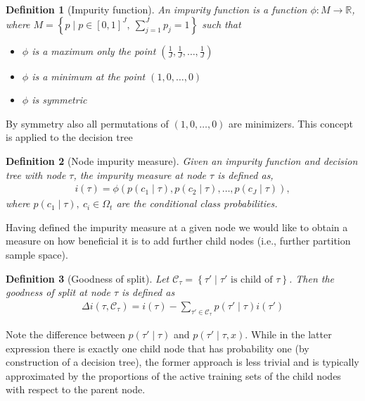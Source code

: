 \documentclass[12pt,a4paper]{article}
\newtheorem{definition}{Definition}
\begin{document}
\begin{definition}[Impurity function] \label{def:impurity_function}An impurity function is a function $\phi: M \rightarrow \mathbb R$, where $M=\left\{p \mid p\in [0,1]^J, ~ \sum_{j=1}^J p_j=1\right\}$ such that
	\begin{itemize}\itemsep0em 
		\item $\phi$ is a maximum only the point $\left(\frac{1}{J}, \frac{1}{J}, \dots, \frac{1}{J}\right)$
		\item $\phi$ is a minimum at the point  $\left(1, 0, \dots, 0\right)$
		\item $\phi$ is symmetric
	\end{itemize}
\end{definition}
By symmetry also all permutations of $\left(1, 0, \dots, 0\right)$ are minimizers. This concept is applied to the decision tree
\begin{definition}[Node impurity measure] Given an impurity function and decision tree with node $\tau$, the impurity measure at node $\tau$ is defined as,
\begin{align*}
	i(\tau) = \phi(p(c_1\mid \tau), p(c_2\mid \tau), \dots, p(c_J\mid \tau)),
\end{align*}
where $p(c_1\mid \tau), ~ c_i \in \Omega_t$ are the conditional class probabilities.
\end{definition}
Having defined the impurity measure at a given node we would like to obtain a measure on how beneficial it is to add further child nodes (i.e., further partition sample space).
\begin{definition}[Goodness of split] \label{def:goodness_of_split}
	Let $\mathcal C_\tau=\left\{\tau' \mid \tau' \text{ is child of }\tau\right\}$. Then the goodness of split at node $\tau$ is defined as
	\begin{align*}
		\Delta i(\tau, \mathcal C_\tau) = i(\tau) - \sum_{\tau' \in \mathcal C_\tau} p(\tau' \mid \tau) i(\tau')
	\end{align*} 
\end{definition}
Note the difference between $p(\tau' \mid \tau)$ and $p(\tau' \mid \tau, x)$. While in the latter expression there is exactly one child node that has probability one (by construction of a decision tree), the former approach is less trivial and is typically approximated by the proportions of the active training sets of the child nodes with respect to the parent node.
\end{document}
